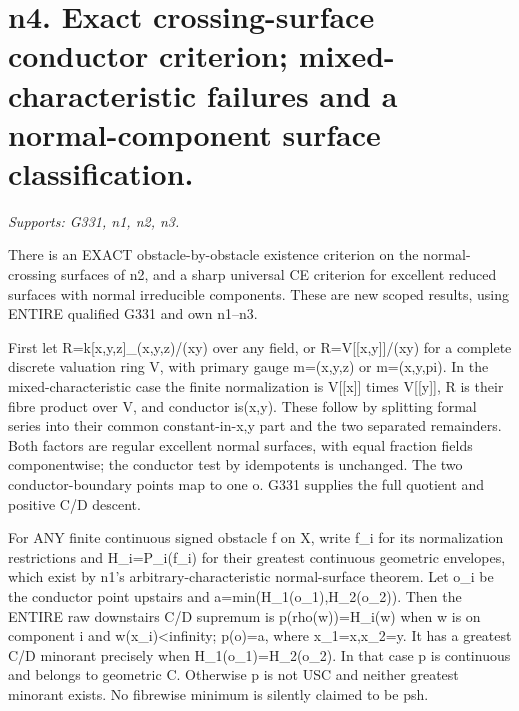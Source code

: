 \section{n4. Exact crossing-surface conductor criterion; mixed-characteristic failures and a normal-component surface classification.}
\textit{Supports: G331, n1, n2, n3.}

There is an EXACT obstacle-by-obstacle existence criterion on the normal-crossing surfaces of n2, and a sharp universal CE criterion for excellent reduced surfaces with normal irreducible components. These are new scoped results, using ENTIRE qualified G331 and own n1--n3.

First let R=k[x,y,z]\_(x,y,z)/(xy) over any field, or R=V[[x,y]]/(xy) for a complete discrete valuation ring V, with primary gauge m=(x,y,z) or m=(x,y,pi). In the mixed-characteristic case the finite normalization is V[[x]] times V[[y]], R is their fibre product over V, and conductor is(x,y). These follow by splitting formal series into their common constant-in-x,y part and the two separated remainders. Both factors are regular excellent normal surfaces, with equal fraction fields componentwise; the conductor test by idempotents is unchanged. The two conductor-boundary points map to one o. G331 supplies the full quotient and positive C/D descent.

For ANY finite continuous signed obstacle f on X, write f\_i for its normalization restrictions and H\_i=P\_i(f\_i) for their greatest continuous geometric envelopes, which exist by n1's arbitrary-characteristic normal-surface theorem. Let o\_i be the conductor point upstairs and a=min(H\_1(o\_1),H\_2(o\_2)). Then the ENTIRE raw downstairs C/D supremum is
p(rho(w))=H\_i(w) when w is on component i and w(x\_i)\textless{}infinity; p(o)=a,
where x\_1=x,x\_2=y. It has a greatest C/D minorant precisely when H\_1(o\_1)=H\_2(o\_2). In that case p is continuous and belongs to geometric C. Otherwise p is not USC and neither greatest minorant exists. No fibrewise minimum is silently claimed to be psh.

